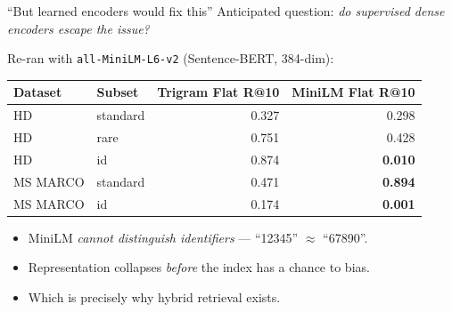 \begin{frame}{``But learned encoders would fix this''}
  Anticipated question: \emph{do supervised dense encoders escape the issue?}

  \medskip
  Re-ran with \texttt{all-MiniLM-L6-v2} (Sentence-BERT, 384-dim):

  \begin{center}
    \small
    \setlength{\tabcolsep}{6pt}
    \begin{tabular}{llrr}
      \toprule
      Dataset & Subset & Trigram Flat R@10 & \textbf{MiniLM Flat R@10} \\
      \midrule
      HD       & standard & 0.327 & 0.298 \\
      HD       & rare     & 0.751 & 0.428 \\
      HD       & {\color{accent}id} & {\color{good}0.874} & {\color{accent}\textbf{0.010}} \\
      MS MARCO & standard & 0.471 & {\color{good}\textbf{0.894}} \\
      MS MARCO & {\color{accent}id} & {\color{good}0.174} & {\color{accent}\textbf{0.001}} \\
      \bottomrule
    \end{tabular}
  \end{center}

  \vspace{0.5em}
  \begin{itemize}
    \item MiniLM \emph{cannot distinguish identifiers} --- ``12345'' $\approx$ ``67890''.
    \item Representation collapses \emph{before} the index has a chance to bias.
    \item Which is precisely why hybrid retrieval exists.
  \end{itemize}
\end{frame}

